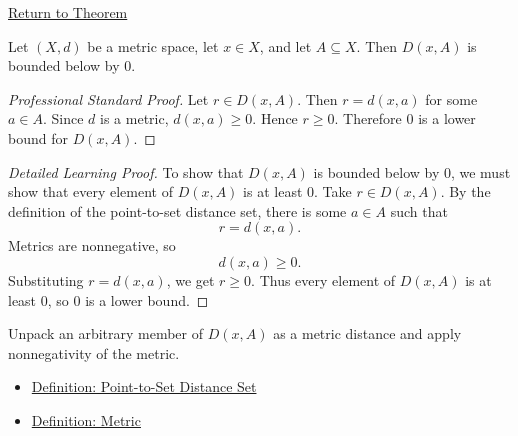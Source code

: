 \newpage
{}
\label{prf:metric-distance-set-bounded-below}

\begin{remark*}[Return]
\hyperref[thm:metric-distance-set-bounded-below]{Return to Theorem}
\end{remark*}

\begin{theorem*}
Let \((X,d)\) be a metric space, let \(x\in X\), and let \(A\subseteq X\).
Then \(D(x,A)\) is bounded below by \(0\).
\end{theorem*}

\begin{proof}[Professional Standard Proof]
\LRAProofBodyStart
Let \(r\in D(x,A)\).  Then \(r=d(x,a)\) for some \(a\in A\).  Since \(d\) is
a metric, \(d(x,a)\geq 0\).  Hence \(r\geq 0\).  Therefore \(0\) is a lower
bound for \(D(x,A)\).
\end{proof}

\begin{proof}[Detailed Learning Proof]
\LRAProofBodyStart
To show that \(D(x,A)\) is bounded below by \(0\), we must show that every
element of \(D(x,A)\) is at least \(0\).  Take \(r\in D(x,A)\).  By the
definition of the point-to-set distance set, there is some \(a\in A\) such
that
\[
  r=d(x,a).
\]
Metrics are nonnegative, so
\[
  d(x,a)\geq 0.
\]
Substituting \(r=d(x,a)\), we get \(r\geq 0\).  Thus every element of
\(D(x,A)\) is at least \(0\), so \(0\) is a lower bound.
\end{proof}

\begin{remark*}
Unpack an arbitrary member of \(D(x,A)\) as a metric distance and apply
nonnegativity of the metric.
\end{remark*}

\begin{dependencies}
\begin{itemize}
  \item \hyperref[def:metric-point-set-distance-set]{Definition: Point-to-Set Distance Set}
  \item \hyperref[def:metric-on-set]{Definition: Metric}
\end{itemize}
\end{dependencies}

\clearpage
